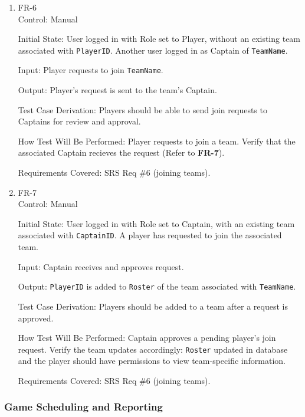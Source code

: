 \documentclass[12pt, titlepage]{article}
\begin{document}
\begin{enumerate}

    \item{FR-6\\}
          Control: Manual

          Initial State: User logged in with Role set to Player, without an existing team associated with \texttt{PlayerID}. Another user logged in as Captain of \texttt{TeamName}.

          Input: Player requests to join \texttt{TeamName}.

          Output: Player's request is sent to the team's Captain.

          Test Case Derivation: Players should be able to send join requests to Captains for review and approval.

          How Test Will Be Performed: Player requests to join a team. Verify that the associated Captain recieves the request (Refer to \textbf{FR-7}).

          Requirements Covered: SRS Req \#6 (joining teams).

    \item{FR-7\\}
          Control: Manual

          Initial State: User logged in with Role set to Captain, with an existing team associated with \texttt{CaptainID}. A player has requested to join the associated team.

          Input: Captain receives and approves request.

          Output: \texttt{PlayerID} is added to \texttt{Roster} of the team associated with \texttt{TeamName}.

          Test Case Derivation: Players should be added to a team after a request is approved.

          How Test Will Be Performed: Captain approves a pending player's join request. Verify the team updates accordingly: \texttt{Roster} updated in database and the player should have permissions to view team-specific information.

          Requirements Covered: SRS Req \#6 (joining teams).

\end{enumerate}

\subsubsection{Game Scheduling and Reporting}
\end{document}
